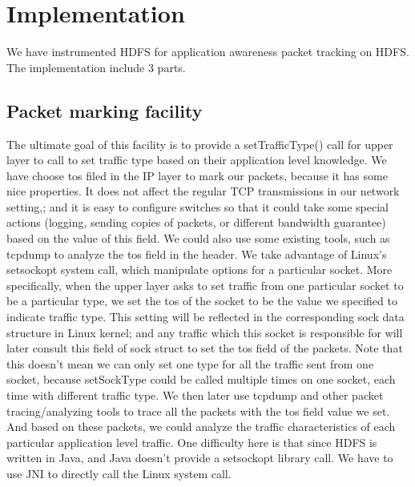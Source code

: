 \section{Implementation}
\label{section:implementation}

We have instrumented HDFS for application awareness packet tracking on HDFS. The implementation include 3 parts. 

\subsection{Packet marking facility}
     The ultimate goal of this facility is to provide a setTrafficType() call for upper layer to call to set traffic type based on their application level knowledge. 
      We have choose tos filed in the IP layer  to mark our packets, because it has some nice properties. It does not affect the regular TCP transmissions in our network setting,; and it is easy to configure switches so that it could take some special actions (logging, sending copies of packets, or different bandwidth guarantee) based on the value of this field. We could also use some existing tools, such as tcpdump to analyze the tos field in the header. We take advantage of Linux's setsockopt system call, which manipulate options for a particular socket. More specifically, when the upper layer asks to set traffic from one particular socket to be a particular type, we set the tos of the socket to be the value we specified to indicate traffic type. This setting will be reflected in the corresponding sock data structure in Linux kernel; and any traffic which this socket is responsible for will later consult this field of sock struct to set the tos field of the packets. Note that this doesn't mean we can only set one type for all the traffic sent from one socket, because setSockType could be called multiple times on one socket, each time with different traffic type.
       We then later use tcpdump and other packet tracing/analyzing tools to trace all the packets with the tos field value we set. And based on these packets, we could analyze the traffic characteristics of each particular application level traffic. 
        One difficulty here is that since HDFS is written in Java, and Java doesn't provide a setsockopt library call. We have to use JNI to directly call the Linux system call. 

